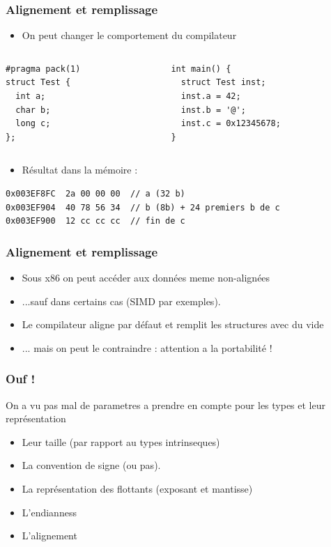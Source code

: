 \documentclass{beamer}
\begin{document}
\begin{frame}[fragile]
\frametitle{Alignement et remplissage}
\begin{itemize}
\item On peut changer le comportement du compilateur 
\end{itemize}
\begin{columns}
  \begin{column}{0.3\textwidth}
\begin{lstlisting}
#pragma pack(1)
struct Test {
  int a;
  char b;
  long c;
};
\end{lstlisting}
  \end{column}
  \begin{column}{0.5\textwidth}
\begin{lstlisting}
int main() {
  struct Test inst;
  inst.a = 42;
  inst.b = '@';
  inst.c = 0x12345678;
}
\end{lstlisting}
  \end{column}
\end{columns}
\pause
\begin{itemize}
\item Résultat dans la mémoire : 
\end{itemize}
\begin{lstlisting}
0x003EF8FC  2a 00 00 00  // a (32 b)  
0x003EF904  40 78 56 34  // b (8b) + 24 premiers b de c 
0x003EF900  12 cc cc cc  // fin de c 
\end{lstlisting}
\end{frame}
\begin{frame}
\frametitle{Alignement et remplissage}
\begin{itemize}
\item Sous x86 on peut accéder aux données meme non-alignées
\item ...sauf dans certains cas (SIMD par exemples).
\item Le compilateur aligne par défaut et remplit les structures avec du vide
\item ... mais on peut le contraindre : attention a la portabilité !
\end{itemize}
\end{frame}

\begin{frame}
\frametitle{Ouf !}
\begin{block}{}
On a vu pas mal de parametres a prendre en compte pour les types et leur représentation
\begin{itemize}
\item Leur taille (par rapport au types intrinseques)
\item La convention de signe (ou pas).
\item La représentation des flottants (exposant et mantisse)
\item L'endianness
\item L'alignement
\end{itemize}
\end{block}
\end{frame}
\end{document}
